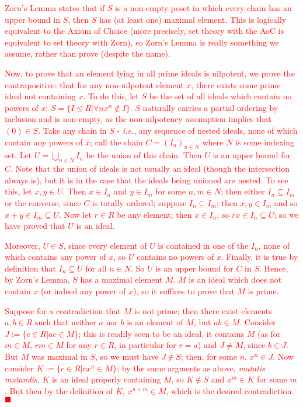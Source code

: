 \documentclass[12pt,a4paper]{article}
\newcommand{\qed}{\hfill$\blacksquare$\gap}
\newcommand{\red}[1]{\textcolor{red}{#1}}
\newcommand{\gap}{\par \vspace{5mm}}
\let\ideal\trianglelefteq
\begin{document}
\red{Zorn's Lemma states that if $S$ is a non-empty poset in which every chain has an upper bound in $S$, then $S$ has (at least one) maximal element. This is logically equivalent to the Axiom of Choice (more precisely, set theory with the AoC is equivalent to set theory with Zorn), so Zorn's Lemma is really something we assume, rather than prove (despite the name).}

\red{Now, to prove that an element lying in all prime ideals is nilpotent, we prove the contrapositive: that for any non-nilpotent element $x$, there exists some prime ideal not containing $x$. To do this, let $S$ be the set of all ideals which contain no powers of $x$: $S=\{I\ideal R | \forall n x^n\notin I\}$. $S$ naturally carries a partial ordering by inclusion and is non-empty, as the non-nilpotency assumption implies that $(0)\in S$. Take any chain in $S$ - \textit{i.e.}, any sequence of nested ideals, none of which contain any powers of $x$; call the chain $C=(I_n)_{n\in N}$ where $N$ is some indexing set. Let $U=\bigcup_{n\in N}I_n$ be the union of this chain. Then $U$ is an upper bound for $C$. Note that the union of ideals is not usually an ideal (though the intersection always is), but it is in the case that the ideals being unioned are nested. To see this, let $x,y\in U$. Then $x\in I_n$ and $y\in I_m$ for some $n,m\in N$; then either $I_n\subseteq I_m$ or the converse, since $C$ is totally ordered; suppose $I_n\subseteq I_m$; then $x,y\in I_m$ and so $x+y\in I_m\subseteq U$. Now let $r\in R$ be any element; then $x\in I_n$, so $rx\in I_n\subseteq U$; so we have proved that $U$ is an ideal.}

\red{Moreover, $U\in S$, since every element of $U$ is contained in one of the $I_n$, none of which contains any power of $x$, so $U$ contains no powers of $x$. Finally, it is true by definition that $I_n\subseteq U$ for all $n\in N$. So $U$ is an upper bound for $C$ in $S$. Hence, by Zorn's Lemma, $S$ has a maximal element $M$. $M$ is an ideal which does not contain $x$ (or indeed any power of $x$), so it suffices to prove that $M$ is prime.}

\red{Suppose for a contradiction that $M$ is not prime; then there exist elements $a,b\in R$ such that neither $a$ nor $b$ is an element of $M$, but $ab\in M$. Consider $J:=\{c\in R | ac\in M\}$; this is readily seen to be an ideal, it contains $M$ (as for $m\in M$, $rm\in M$ for any $r\in R$, in particular for $r=a$) and $J\neq M$, since $b\in J$. But $M$ was maximal in $S$, so we must have $J\notin S$; then, for some $n$, $x^n\in J$. Now consider $K:=\{c\in R | cx^n\in M\}$; by the same argments as above, \textit{mutatis mutandis}, $K$ is an ideal properly containing $M$, so $K\notin S$ and $x^m\in K$ for some $m$. But then by the definition of $K$, $x^{n+m}\in M$, which is the desired contradiction.\qed}
\end{document}
